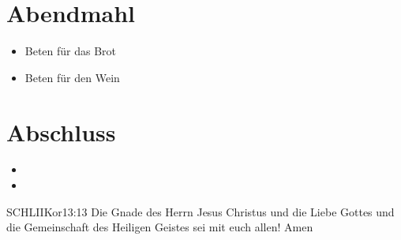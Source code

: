 \documentclass[fontsize=14pt]{mybib}
\begin{document}
\section{Abendmahl}
\begin{itemize}
\item[] Beten für das Brot
\item[] Beten für den Wein
\end{itemize}

\section{Abschluss}
\begin{itemize}
\item[] 
\item[] \beten{}
\end{itemize}

\begin{bibelbox}{SCHL}{IIKor}{13:13}
    Die Gnade des Herrn Jesus Christus und die Liebe Gottes und die Gemeinschaft des Heiligen Geistes sei mit euch allen! Amen
\end{bibelbox}
\end{document}
